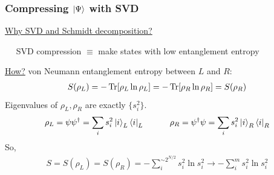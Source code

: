 \documentclass{beamer}
\theoremstyle{definition}
\begin{document}
\begin{frame}
	\frametitle{Compressing $\ket{\Psi}$ with SVD}
	
	\underline{Why SVD and Schmidt decomposition?} \\
	
	\vspace{8pt}
	
	$\quad$ SVD compression $\equiv$ make states with low entanglement entropy\\
	
	
	\vspace{8pt} \pause
	
	\underline{How?} von Neumann entanglement entropy between $L$ and $R$:
	\begin{align*}
		S(\rho_L) = -\Tr[\rho_L \ln \rho_L] = -\Tr[\rho_R \ln \rho_R] = S(\rho_R) 
	\end{align*}
\pause
	Eigenvalues of $\rho_L, \rho_R$ are exactly $\{s_i^2\}$.
	\begin{align*}
		\rho_L = \psi\psi^\dagger = \sum_i s_i^2 \ket{i}_L \bra{i}_L \quad\quad\quad \rho_R = \psi^\dagger\psi = \sum_i s_i^2 \ket{i}_R \bra{i}_R
	\end{align*} \pause
So, \vspace{-30pt}
	\begin{align*}
		S = S(\rho_L) = S(\rho_R) = -\sum_i^{\sim 2^{N/2}} s_i^2 \ln s_i^2 \to -\sum_i^m s_i^2 \ln s_i^2
	\end{align*}
	
\end{frame}
\end{document}
